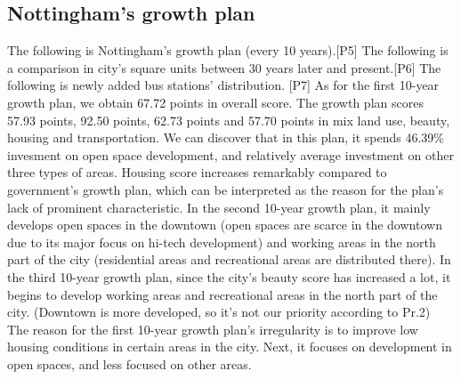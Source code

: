 \subsection{Nottingham's growth plan}
The following is Nottingham's growth plan (every 10 years).[P5]
The following is a comparison in city's square units between 30 years later and present.[P6]
The following is newly added bus stations' distribution. [P7]
As for the first 10-year growth plan, we obtain 67.72 points in overall score. The growth plan scores 57.93 points, 92.50 points, 62.73 points and 57.70 points in mix land use, beauty, housing and transportation. We can discover that in this plan, it spends 46.39\% invesment on open space development, and relatively average investment on other three types of areas. Housing score increases remarkably compared to government's growth plan, which can be interpreted as the reason for the plan's lack of prominent characteristic. In the second 10-year growth plan, it mainly develops open spaces in the downtown (open spaces are scarce in the downtown due to its major focus on hi-tech development) and working areas in the north part of the city (residential areas and recreational areas are distributed there). In the third 10-year growth plan, since the city's beauty score has increased a lot, it begins to develop working areas and recreational areas in the north part of the city. (Downtown is more developed, so it's not our priority according to Pr.2) The reason for the first 10-year growth plan's irregularity is to improve low housing conditions in certain areas in the city. Next, it focuses on development in open spaces, and less focused on other areas.
